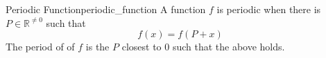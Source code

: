 \begin{definition} {Periodic Function}{periodic_function}
  A function \(f\) is periodic when there is \(P \in \mathbb{R} ^{\neq 0}\) such
  that
  \[
  f\left(x\right) = f\left(P + x\right)
  \]
  The period of of \(f\) is the \(P\) closest to \(0\) such that the above
  holds.
\end{definition}

